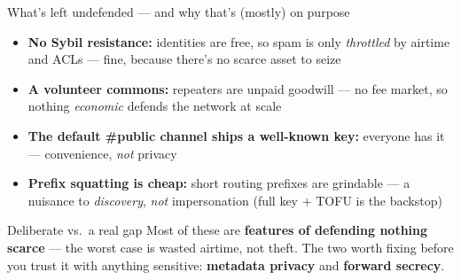 \documentclass[aspectratio=\baAspect,t,9pt]{beamer}
\begin{document}
\begin{frame}{What's left undefended --- and why that's (mostly) on purpose}
  \begin{itemize}
    \item \textbf{No Sybil resistance:} identities are free, so spam is only
      \emph{throttled} by airtime and ACLs --- fine, because there's no scarce
      asset to seize
    \item \textbf{A volunteer commons:} repeaters are unpaid goodwill --- no fee
      market, so nothing \emph{economic} defends the network at scale
    \item \textbf{The default \#public channel ships a well-known key:} everyone
      has it --- convenience, \emph{not} privacy
    \item \textbf{Prefix squatting is cheap:} short routing prefixes are grindable
      --- a nuisance to \emph{discovery}, \emph{not} impersonation (full key
      $+$ TOFU is the backstop)
  \end{itemize}
  \vfill
  \begin{alertblock}{Deliberate vs.\ a real gap}
    Most of these are \textbf{features of defending nothing scarce} --- the worst
    case is wasted airtime, not theft. The two worth fixing before you trust it
    with anything sensitive: \textbf{metadata privacy} and \textbf{forward secrecy}.
  \end{alertblock}
\end{frame}

\end{document}
